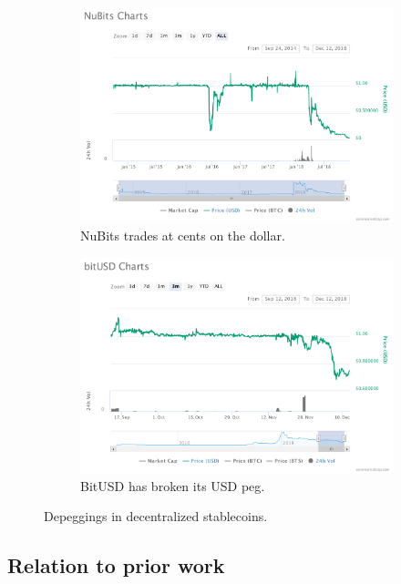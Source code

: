 \begin{figure}
	\centering
	\begin{subfigure}[b]{0.4\textwidth}
		\includegraphics[width=\textwidth]{figures/nubits_chart}
		\caption{NuBits trades at cents on the dollar.}\label{fig:nubits_chart}
	\end{subfigure}
	\begin{subfigure}[b]{0.4\textwidth}
		\includegraphics[width=\textwidth]{figures/bitusd_chart}
		\caption{BitUSD has broken its USD peg.}\label{fig:bitusd_chart}
	\end{subfigure}
	\caption{Depeggings in decentralized stablecoins.}
\end{figure}




\subsection{Relation to prior work}

